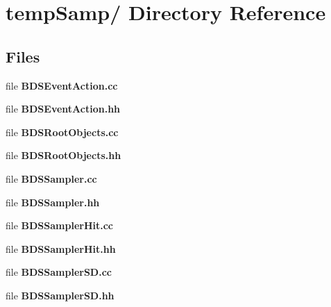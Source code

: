 \section{temp\-Samp/ Directory Reference}
\label{dir_000001}
\subsection*{Files}
\begin{CompactItemize}
\item 
file {\bf BDSEventAction.cc}
\item 
file {\bf BDSEventAction.hh}
\item 
file {\bf BDSRootObjects.cc}
\item 
file {\bf BDSRootObjects.hh}
\item 
file {\bf BDSSampler.cc}
\item 
file {\bf BDSSampler.hh}
\item 
file {\bf BDSSamplerHit.cc}
\item 
file {\bf BDSSamplerHit.hh}
\item 
file {\bf BDSSamplerSD.cc}
\item 
file {\bf BDSSamplerSD.hh}
\end{CompactItemize}
